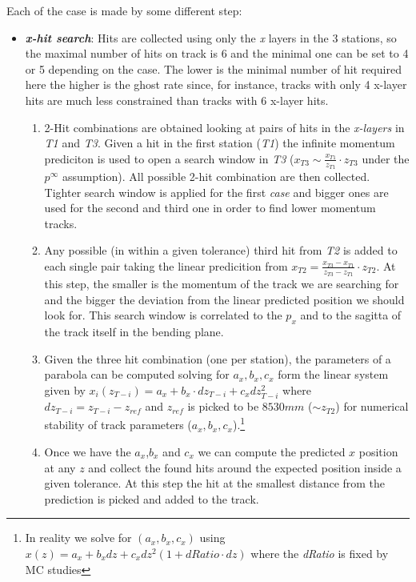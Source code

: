 \documentclass[paper=a4, fontsize=10pt]{scrartcl}
\numberwithin{equation}{section}		%
\numberwithin{figure}{section}			%
\numberwithin{table}{section}				%
\begin{document}
Each of the case is made by some different step:
\begin{itemize}
  \item{\textbf{\textit{x-hit search}}: Hits are collected using only the \textit{x} layers in the 3 stations, so the maximal number of hits on track is 6 and the minimal one can be set to 4 or 5 depending on the case. The lower is the minimal number of hit required here the higher is the ghost rate since, for instance, tracks with only 4 x-layer hits are much less constrained than tracks with 6 x-layer hits.}
    \begin{enumerate}
    \item{2-Hit combinations are obtained looking at pairs of hits in the \textit{x-layers} in \textit{T1} and \textit{T3}. Given a hit in the first station (\textit{T1}) the infinite momentum prediciton is used to open a search window in \textit{T3} ($x_{T3} \sim \frac{x_{T1}}{z_{T1}}\cdot z_{T3}$ under the $p^{ \infty }$ assumption). All possible 2-hit combination are then collected. Tighter search window is applied for the first \textit{case} and bigger ones are used for the second and third one in order to find lower momentum tracks.}
      \item{Any possible (in within a given tolerance) third hit from \textit{T2} is added to each single pair taking the linear predicition from $x_{T2} = \frac{x_{T3}-x_{T1}}{z_{T3}-z_{T1}}\cdot z_{T2}$. At this step, the smaller is the momentum of the track we are searching for and the bigger the deviation from the linear predicted position we should look for. This search window is correlated to the $p_{x}$ and to the sagitta of the track itself in the bending plane.}
      \item{Given the three hit combination (one per station), the parameters of a parabola can be computed solving for $a_{x},b_x,c_x$ form the linear system given by $x_{i}(z_{T-i})= a_{x}+b_{x}\cdot dz_{T-i}+c_{x}dz_{T-i}^{2}$ where $dz_{T-i} = z_{T-i}-z_{ref}$ and $z_{ref}$ is picked to be $8530 mm$ ($\sim z_{T2}$) for numerical stability of track parameters ($a_{x},b_{x},c_{x}$).\footnote{In reality we solve for $(a_{x},b_{x},c_{x})$ using $x(z)=a_{x}+b_{x}dz+c_{x}dz^{2}(1+dRatio\cdot dz)$ where the \textit{dRatio} is fixed by MC studies}}
      \item{Once we have the $a_{x}$,$b_{x}$ and $c_{x}$ we can compute the predicted $x$ position at any $z$ and collect the found hits around the expected position inside a given tolerance. At this step the hit at the smallest distance from the prediction is picked and added to the track.}

\end{enumerate}
\end{itemize}
\end{document}
